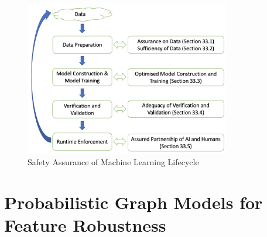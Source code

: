 \begin{figure}[!htbp]
    \centering
    \includegraphics[width=0.8\textwidth]{images/LookFurther/lifecycle.png}
    \caption{Safety Assurance of Machine Learning Lifecycle}
    \label{fig:lifecyle}
\end{figure}




















\chapter{Probabilistic Graph Models for Feature Robustness}\label{chap:pgmfeature}






